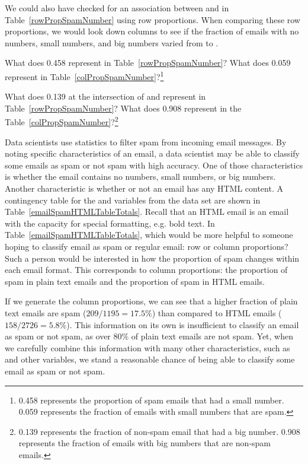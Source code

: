 We could also have checked for an association between  and  in Table~\ref{rowPropSpamNumber} using row proportions. When comparing these row proportions, we would look down columns to see if the fraction of emails with no numbers, small numbers, and big numbers varied from  to .

\begin{exercise}
What does 0.458 represent in Table~\ref{rowPropSpamNumber}? What does 0.059 represent in Table~\ref{colPropSpamNumber}?\footnote{0.458 represents the proportion of spam emails that had a small number. 0.059 represents the fraction of emails with small numbers that are spam.}
\end{exercise}

\begin{exercise}
What does 0.139 at the intersection of  and  represent in Table~\ref{rowPropSpamNumber}? What does 0.908 represent in the Table~\ref{colPropSpamNumber}?\footnote{0.139 represents the fraction of non-spam email that had a big number. 0.908 represents the fraction of emails with big numbers that are non-spam emails.}
\end{exercise}

\begin{example}{Data scientists use statistics to filter spam from incoming email messages. By noting specific characteristics of an email, a data scientist may be able to classify some emails as spam or not spam with high accuracy. One of those characteristics is whether the email contains no numbers, small numbers, or big numbers. Another characteristic is whether or not an email has any HTML content. A contingency table for the  and  variables from the  data set are shown in Table~\ref{emailSpamHTMLTableTotals}. Recall that an HTML email is an email with the capacity for special formatting, e.g. bold text. In Table~\ref{emailSpamHTMLTableTotals}, which would be more helpful to someone hoping to classify email as spam or regular email: row or column proportions?} \label{weighingRowColumnProportions}
Such a person would be interested in how the proportion of spam changes within each email format. This corresponds to column proportions: the proportion of spam in plain text emails and the proportion of spam in HTML emails.

If we generate the column proportions, we can see that a higher fraction of plain text emails are spam ($209/1195 = 17.5\%$) than compared to HTML emails ($158/2726 = 5.8\%$). This information on its own is insufficient to classify an email as spam or not spam, as over 80\% of plain text emails are not spam. Yet, when we carefully combine this information with many other characteristics, such as  and other variables, we stand a reasonable chance of being able to classify some email as spam or not spam. 
\end{example}

